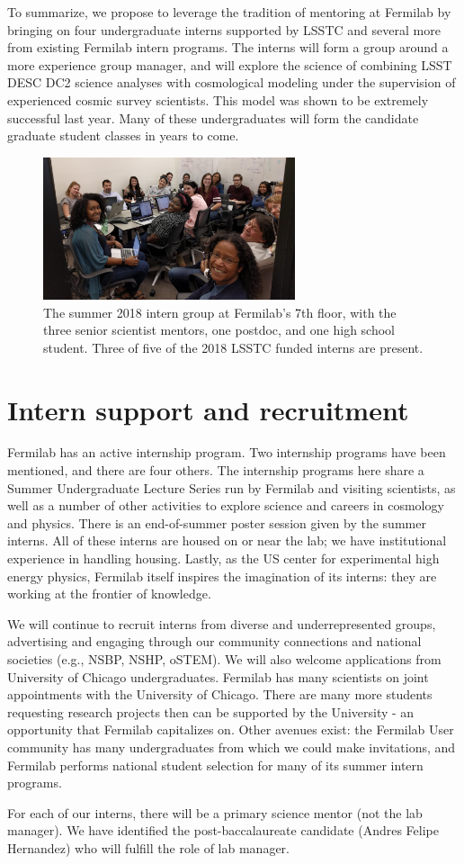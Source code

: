 To summarize, we  propose to leverage the tradition 
of mentoring at Fermilab by
bringing on four undergraduate interns supported by LSSTC
and several more from existing Fermilab intern programs.
The interns will form a group around a more experience
group manager, and will explore the science
of combining LSST DESC DC2 science analyses with cosmological modeling
under the supervision of experienced cosmic
survey scientists. This  model was shown to be extremely successful last year. 
Many of these undergraduates will
form the candidate graduate student classes in years to come.

\begin{figure}
  \centering
    \includegraphics[width=0.66\textwidth]{interns.png}
  \caption*{The summer 2018 intern group at Fermilab's 7th floor, with the 
three senior scientist mentors, one postdoc, and one high school student. 
Three of five of the 2018 LSSTC funded interns are present.}
\end{figure}

\newpage
\section{Intern support and recruitment}

Fermilab has an active internship program. Two internship programs
have been mentioned, and there are four others. The internship
programs here share a Summer Undergraduate Lecture Series run by
Fermilab and visiting scientists, as well as a number of other activities to explore science and careers in cosmology and physics. There is an end-of-summer poster
session given by the summer interns. All of these interns
are housed on or near the lab; we have institutional
experience in handling housing. Lastly, as the US center for
experimental high energy physics, Fermilab itself inspires
the imagination of its interns: they are working at the frontier
of knowledge.

We will continue to recruit interns from diverse and underrepresented groups, 
advertising and engaging through our community connections and national societies (e.g., NSBP, NSHP, oSTEM). 
We will also welcome applications from University of Chicago undergraduates. 
Fermilab has many scientists on joint appointments with
the University of Chicago. There are many more students
requesting research projects then can be supported by 
the University - an opportunity that Fermilab capitalizes on.
Other avenues exist: the Fermilab User community has many undergraduates
from which we could make invitations, 
and Fermilab performs national student selection for many of its summer
intern programs.

For each of our interns, there will be a primary science mentor (not the lab manager). 
We have identified the post-baccalaureate candidate (Andres Felipe Hernandez) who will fulfill the role of lab manager.



